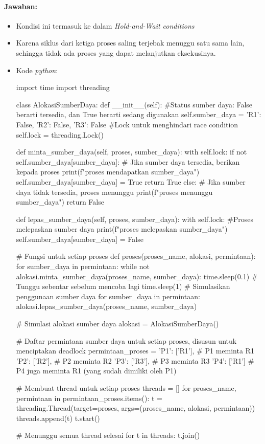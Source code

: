 \documentclass[12pt]{article}
\begin{document}
    \paragraph{Jawaban:} 
    \begin{itemize}
    \item Kondisi ini termasuk ke dalam  \textit{Hold-and-Wait conditions}
    \item Karena siklus dari ketiga proses saling terjebak menuggu satu sama lain, sehingga tidak ada proses yang dapat melanjutkan eksekusinya.
    \item Kode \textit{python}:
\begin{python}
    import time
import threading

class AlokasiSumberDaya:
    def __init__(self):
        #Status sumber daya: False berarti tersedia, dan True berarti sedang digunakan
        self.sumber_daya = {'R1': False, 'R2': False, 'R3': False}
        #Lock untuk menghindari race condition
        self.lock = threading.Lock()  

    def minta_sumber_daya(self, proses, sumber_daya):
        with self.lock:
            if not self.sumber_daya[sumber_daya]:
    # Jika sumber daya tersedia, berikan kepada proses
                print(f"{proses} mendapatkan {sumber_daya}")
                self.sumber_daya[sumber_daya] = True
                return True
            else:
    # Jika sumber daya tidak tersedia, proses menunggu
                print(f"{proses} menunggu {sumber_daya}")
                return False

    def lepas_sumber_daya(self, proses, sumber_daya):
        with self.lock:
    #Proses melepaskan sumber daya
        print(f"{proses} melepaskan {sumber_daya}")
            self.sumber_daya[sumber_daya] = False

# Fungsi untuk setiap proses
def proses(proses_name, alokasi, permintaan):
    for sumber_daya in permintaan:
        while not alokasi.minta_sumber_daya(proses_name, sumber_daya):
            time.sleep(0.1)  # Tunggu sebentar sebelum mencoba lagi
    time.sleep(1)  # Simulasikan penggunaan sumber daya
    for sumber_daya in permintaan:
        alokasi.lepas_sumber_daya(proses_name, sumber_daya)

# Simulasi alokasi sumber daya
alokasi = AlokasiSumberDaya()

# Daftar permintaan sumber daya untuk setiap proses, disusun untuk menciptakan deadlock
permintaan_proses = {
    'P1': ['R1'],  # P1 meminta R1
    'P2': ['R2'],  # P2 meminta R2
    'P3': ['R3'],  # P3 meminta R3
    'P4': ['R1']   # P4 juga meminta R1 (yang sudah dimiliki oleh P1)
}

# Membuat thread untuk setiap proses
threads = []
for proses_name, permintaan in permintaan_proses.items():
    t = threading.Thread(target=proses, args=(proses_name, alokasi, permintaan))
    threads.append(t)
    t.start()

# Menunggu semua thread selesai
for t in threads:
    t.join()
\end{python}

      
    \end{itemize}
    
\end{document}
